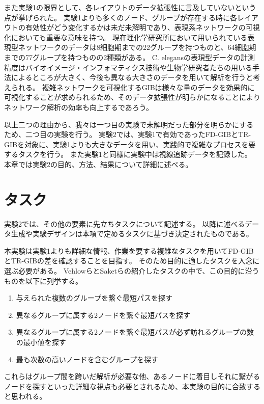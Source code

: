\documentclass{kuee}
\begin{document}
また実験1の限界として、各レイアウトのデータ拡張性に言及していないという点が挙げられた。
実験1よりも多くのノード、グループが存在する時に各レイアウトの有効性がどう変化するかは未だ未解明であり、表現系ネットワークの可視化においても重要な意味を持つ。
現在理化学研究所において用いられている表現型ネットワークのデータは8細胞期までの22グループを持つものと、64細胞期までの77グループを持つものの2種類がある。
C. elegansの表現型データの計測精度はバイオイメージ・インフォマティクス技術や生物学研究者たちの用いる手法によるところが大きく、今後も異なる大きさのデータを用いて解析を行うと考えられる。
複雑ネットワークを可視化するGIBは様々な量のデータを効果的に可視化することが求められるため、そのデータ拡張性が明らかになることによりネットワーク解析の効率も向上するであろう。

以上二つの理由から、我々は一つ目の実験で未解明だった部分を明らかにするため、二つ目の実験を行う。
実験2では、実験1で有効であったFD-GIBとTR-GIBを対象に、実験1よりも大きなデータを用い、実践的で複雑なプロセスを要するタスクを行う。
また実験1と同様に実験中は視線追跡データを記録した。
本章では実験2の目的、方法、結果について詳細に述べる。

\section{タスク}
\label{sec:task-ex2}

実験2では、その他の要素に先立ちタスクについて記述する。
以降に述べるデータ生成や実験デザインは本項で定めるタスクに基づき決定されたものである。

本実験は実験1よりも詳細な情報、作業を要する複雑なタスクを用いてFD-GIBとTR-GIBの差を確認することを目指す。
そのため目的に適したタスクを入念に選ぶ必要がある。
Vehlowら\cite{Vehlow2017VisualizingGS}とSaketら\cite{saket2014group}の紹介したタスクの中で、この目的に沿うものを以下に列挙する。
\begin{enumerate}
  \item 与えられた複数のグループを繋ぐ最短パスを探す
  \item 異なるグループに属する2ノードを繋ぐ最短パスを探す
  \item 異なるグループに属する2ノードを繋ぐ最短パスが必ず訪れるグループの数の最小値を探す
  \item 最も次数の高いノードを含むグループを探す
\end{enumerate}
これらはグループ間を跨いだ解析が必要な他、あるノードに着目しそれに繋がるノードを探すといった詳細な視点も必要とされるため、本実験の目的に合致すると思われる。
\end{document}
